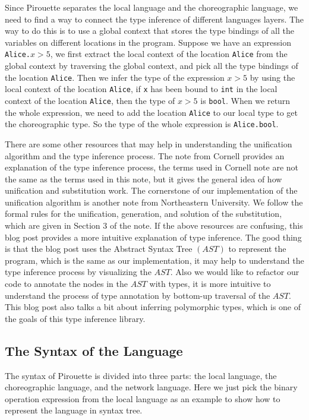 \documentclass{article}
\begin{document}
    Since Pirouette separates the local language and the choreographic language, we need to find a way to connect the type inference of different languages layers.
    The way to do this is to use a global context that stores the type bindings of all the variables on different locations in the program. Suppose we have an expression 
    \texttt{Alice.\(x > 5\)}, we first extract the local context of the location \texttt{Alice} from the global context by traversing the global context, and pick all the type bindings of the location \texttt{Alice}.
    Then we infer the type of the expression \texttt{\(x > 5\)} by using the local context of the location \texttt{Alice}, if \texttt{x} has been bound to \texttt{int} in the local context of the location \texttt{Alice},
    then the type of \texttt{\(x > 5\)} is \texttt{bool}. When we return the whole expression, we need to add the location \texttt{Alice} to our local type to get the choreographic type. So the type of the whole expression is \texttt{Alice.bool}.

    There are some other resources that may help in understanding the unification algorithm and the type inference process.
    The note from Cornell\cite{Cornell} provides an explanation of the type inference process,
    the terms used in Cornell note are not the same as the terms used in this note, but it gives the general idea of how unification and substitution work.
    The cornerstone of our implementation of the unification algorithm is another note from Northeastern University\cite{NEU2}.
    We follow the formal rules for the unification, generation, and solution of the substitution, which are given in Section 3 of the note.
    If the above resources are confusing, this blog post\cite{TypInferBlog} provides a more intuitive explanation of type inference.
    The good thing is that the blog post uses the Abstract Syntax Tree $(AST)$\cite{ASTBlog} to represent the program,
    which is the same as our implementation, it may help to understand the type inference process by visualizing the $AST$.
    Also we would like to refactor our code to annotate the nodes in the $AST$ with types, it is more intuitive to understand
    the process of type annotation by bottom-up traversal of the $AST$. This blog post also talks a bit about inferring polymorphic types,
    which is one of the goals of this type inference library.


\subsection{The Syntax of the Language}
    The syntax of Pirouette is divided into three parts: the local language, the choreographic language, and the network language.
    Here we just pick the binary operation expression from the local language as an example to show how to represent the language in syntax tree.
\end{document}
